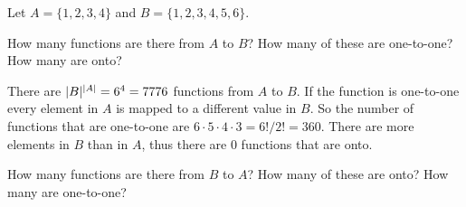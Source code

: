 \documentclass[a4paper, english, 12pt]{article} %
\begin{document}
\begin{problem}
  Let $A = \{1, 2, 3, 4\}$ and $B = \{1, 2, 3, 4, 5, 6\}$.
\end{problem}

\begin{subproblem}
  How many functions are there from $A$ to $B$? How many of these are
  one-to-one? How many are onto?
\end{subproblem}

\begin{answer}
  There are $\lvert B\rvert^{\lvert A\rvert} = 6^4 = 7776$ functions from $A$ to $B$. If the
  function is one-to-one every element in $A$ is mapped to a different value in
  $B$. So the number of functions that are one-to-one are $6 \cdot 5 \cdot 4
  \cdot 3 = 6!/2! = 360$. There are more elements in $B$ than in $A$, thus there
  are $0$ functions that are onto.
\end{answer}

\begin{subproblem}
  How many functions are there from $B$ to $A$? How many of these are
  onto? How many are one-to-one?
\end{subproblem}
\end{document}

